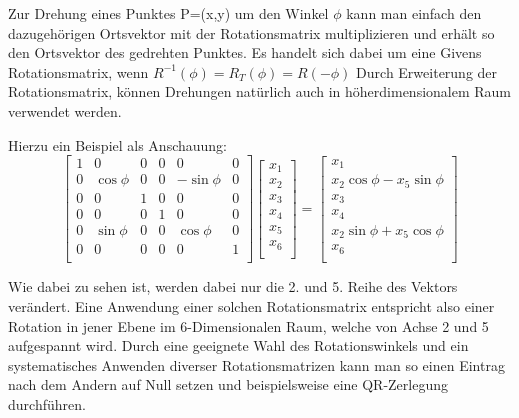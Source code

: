 Zur Drehung eines Punktes P=(x,y) um den Winkel $\phi$ kann man einfach den dazugehörigen Ortsvektor mit der Rotationsmatrix multiplizieren und erhält so den Ortsvektor des gedrehten Punktes.
Es handelt sich dabei um eine Givens Rotationsmatrix, wenn $R^{-1}(\phi)=R_{T}(\phi)=R(-\phi)$
Durch Erweiterung der Rotationsmatrix, können Drehungen natürlich auch in höherdimensionalem Raum verwendet werden. 

Hierzu ein Beispiel als Anschauung:
\begin{equation}
	\begin{bmatrix}
	1 & 0 & 0 & 0 & 0 & 0 \\
	0 & \cos\phi & 0 & 0 & -\sin\phi & 0 \\
	0 & 0 & 1 & 0 & 0 & 0 \\
	0 & 0 & 0 & 1 & 0 & 0 \\
	0 & \sin\phi & 0 & 0 & \cos\phi & 0 \\
	0 & 0 & 0 & 0 & 0 & 1 \\
	\end{bmatrix}
	\begin{bmatrix}
	x_{1}\\
	x_{2}\\
	x_{3}\\
	x_{4}\\
	x_{5}\\
	x_{6}\\
	\end{bmatrix}
	=
	\begin{bmatrix}
	x_{1}\\
	x_{2}\cos\phi-x_{5}\sin\phi\\
	x_{3}\\
	x_{4}\\
	x_{2}\sin\phi+x_{5}\cos\phi\\
	x_{6}\\
	\end{bmatrix}
\end{equation}	

Wie dabei zu sehen ist, werden dabei nur die 2. und 5. Reihe des Vektors verändert.
Eine Anwendung einer solchen Rotationsmatrix entspricht also einer Rotation in jener Ebene im 6-Dimensionalen Raum, welche von Achse 2 und 5 aufgespannt wird.
Durch eine geeignete Wahl des Rotationswinkels und ein systematisches Anwenden diverser Rotationsmatrizen kann man so einen Eintrag nach dem Andern auf Null setzen und beispielsweise eine QR-Zerlegung durchführen. \cite{francis:QR_Zerlegung}

